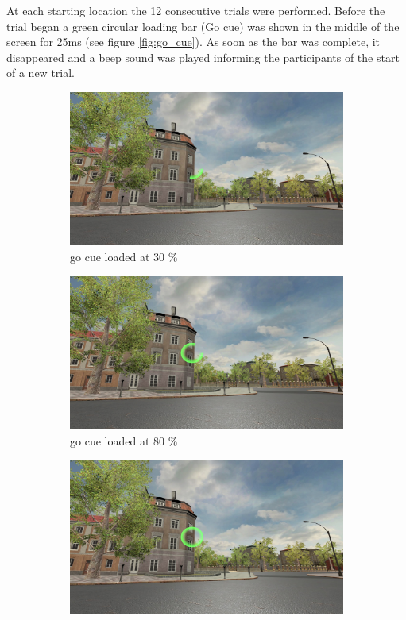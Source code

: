At each starting location the 12 consecutive trials were performed. Before the trial began a green circular loading bar {\emphasize (Go cue)} was shown in the middle of the screen for 25ms (see figure \ref{fig:go_cue}). As soon as the bar was complete, it disappeared and a beep sound was played informing the participants of the start of a new trial. 

\begin{figure}[h!]
	\centering
	\begin{subfigure}[b]{0.3\linewidth}
		\includegraphics[width=\linewidth]{figures/go_cue_30.jpg}
		\caption{go cue loaded at 30 \%}
		\label{fig:go_cue_30}
	\end{subfigure}
	\begin{subfigure}[b]{0.3\linewidth}
		\includegraphics[width=\linewidth]{figures/go_cue_80.jpg}
		\caption{go cue loaded at 80 \%}
		\label{fig:go_cue_80}
	\end{subfigure}
	\begin{subfigure}[b]{0.3\linewidth}
		\includegraphics[width=\linewidth]{figures/go_cue_full.jpg}

\end{subfigure}
\end{figure}
